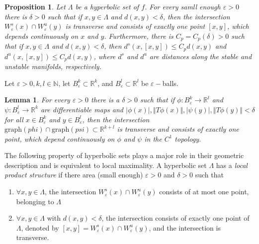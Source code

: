 \documentclass{article}
\newtheorem{prop}{Proposition}
\newtheorem{lem}{Lemma}
\begin{document}
\begin{prop}

Let $\Lambda$ be a hyperbolic set of $f$. For every samll enough $\varepsilon >0$ there is $\delta >0$ such that if $x,y \in \Lambda$ and $d(x,y)< \delta$, then the intersection $W^s_{\varepsilon}(x) \cap W^u_{\varepsilon}(y)$ is transverse and consists of exactly one point $[x,y]$, which depends continuously on $x$ and $y$. Furthermore, there is $C_p = C_p(\delta)>0$ such that if $x,y \in \Lambda$ and $d(x,y) < \delta$, then $d^s(x,[x,y]) \leq C_p d(x,y)$ and $d^u(x,[x,y]) \leq C_p d(x,y)$, where $d^s$ and $d^u$ are distances along the stable and unstable manifolds, respectively.

\end{prop}

Let $\varepsilon > 0, k,l \in \mathbb{N}$, let $B^k_{\varepsilon} \subset \mathbb{R}^k$, and $B^l_{\varepsilon} \subset \mathbb{R}^l$ be $\varepsilon-$balls.

\begin{lem}

For every $\varepsilon > 0$ there is a $\delta > 0$ such that if $\phi: B^k_{\varepsilon} \to \mathbb{R}^l$ and $\psi: B^l_{\varepsilon} \to \mathbb{R}^k$ are differentiable maps and $\vert \phi (x) \vert, \Vert T\phi(x) \Vert, \vert \psi (y) \vert, \Vert T\phi(y) \Vert < \delta$ for all $x \in B^k_{\varepsilon}$ and $y \in B^l_{\varepsilon}$, then the intersection $\mathrm{graph}(phi) \cap \mathrm{graph}(psi) \subset \mathbb{R}^{k+l}$ is transverse and consists of exactly one point, which depend continuously on $\phi$ and $\psi$ in the $C^1$ topology.

\end{lem}

\indent The following property of hyperbolic sets plays a major role in their geometric description and is equivalent to local maximality. A hyperbolic set $\Lambda$ has a \textit{local product structure} if there area (small enough) $\varepsilon > 0$ and $\delta > 0$ such that 
\begin{enumerate}
    \item $\forall x,y \in \Lambda$, the intersection $W^s_{\varepsilon}(x) \cap W^u_{\varepsilon}(y)$ consists of at most one point, belonging to $\Lambda$
    \item $\forall x,y \in \Lambda$ with $d(x,y)< \delta$, the intersection consists of exactly one point of $\Lambda$, denoted by $[x,y]=W^s_{\varepsilon}(x) \cap W^u_{\varepsilon}(y)$, and the intersection is transverse. 
\end{enumerate}
\end{document}
